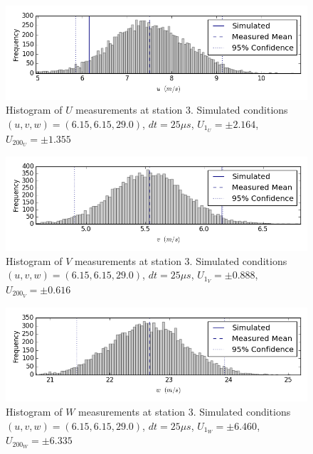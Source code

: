 \begin{figure}[H]
\centering
\includegraphics[width=6in]{figs/Ely_May28th03001/uncertainty_Ely_May28th03001_U}
\caption{Histogram of $U$ measurements at station 3. Simulated conditions $(u,v,w)=(6.15, 6.15, 29.0)$, $dt=25 \mu s$, $U_1_U=\pm 2.164$, $U_200_U=\pm 1.355$}
\label{fig:uncertainty_Ely_May28th03001_U}
\end{figure}


\begin{figure}[H]
\centering
\includegraphics[width=6in]{figs/Ely_May28th03001/uncertainty_Ely_May28th03001_V}
\caption{Histogram of $V$ measurements at station 3. Simulated conditions $(u,v,w)=(6.15, 6.15, 29.0)$, $dt=25 \mu s$, $U_1_V=\pm 0.888$, $U_200_V=\pm 0.616$}
\label{fig:uncertainty_Ely_May28th03001_V}
\end{figure}


\begin{figure}[H]
\centering
\includegraphics[width=6in]{figs/Ely_May28th03001/uncertainty_Ely_May28th03001_W}
\caption{Histogram of $W$ measurements at station 3. Simulated conditions $(u,v,w)=(6.15, 6.15, 29.0)$, $dt=25 \mu s$, $U_1_W=\pm 6.460$, $U_200_W=\pm 6.335$}
\label{fig:uncertainty_Ely_May28th03001_W}
\end{figure}



